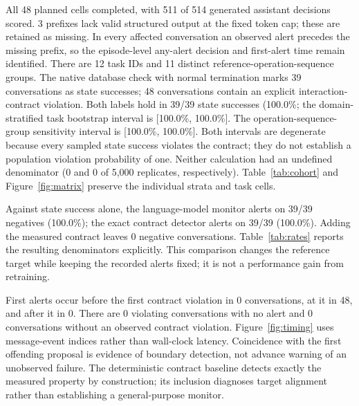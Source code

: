 All 48 planned cells completed, with 511 of 514 generated assistant decisions scored. 3 prefixes lack valid structured output at the fixed token cap; these are retained as missing. In every affected conversation an observed alert precedes the missing prefix, so the episode-level any-alert decision and first-alert time remain identified. There are 12 task IDs and 11 distinct reference-operation-sequence groups. The native database check with normal termination marks 39 conversations as state successes; 48 conversations contain an explicit interaction-contract violation. Both labels hold in 39/39 state successes (100.0\%; the domain-stratified task bootstrap interval is [100.0\%, 100.0\%]. The operation-sequence-group sensitivity interval is [100.0\%, 100.0\%]. Both intervals are degenerate because every sampled state success violates the contract; they do not establish a population violation probability of one. Neither calculation had an undefined denominator (0 and 0 of 5,000 replicates, respectively). Table~\ref{tab:cohort} and Figure~\ref{fig:matrix} preserve the individual strata and task cells.

Against state success alone, the language-model monitor alerts on 39/39 negatives (100.0\%); the exact contract detector alerts on 39/39 (100.0\%). Adding the measured contract leaves 0 negative conversations. Table~\ref{tab:rates} reports the resulting denominators explicitly. This comparison changes the reference target while keeping the recorded alerts fixed; it is not a performance gain from retraining.

First alerts occur before the first contract violation in 0 conversations, at it in 48, and after it in 0. There are 0 violating conversations with no alert and 0 conversations without an observed contract violation. Figure~\ref{fig:timing} uses message-event indices rather than wall-clock latency. Coincidence with the first offending proposal is evidence of boundary detection, not advance warning of an unobserved failure. The deterministic contract baseline detects exactly the measured property by construction; its inclusion diagnoses target alignment rather than establishing a general-purpose monitor.
